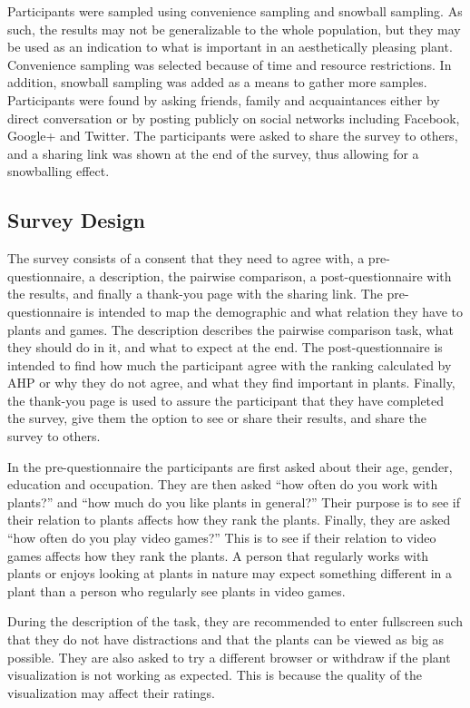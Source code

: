Participants were sampled using convenience sampling and snowball sampling.
As such, the results may not be generalizable to the whole population, but they may be used as an indication to what is important in an aesthetically pleasing plant.
Convenience sampling was selected because of time and resource restrictions.
In addition, snowball sampling was added as a means to gather more samples.
Participants were found by asking friends, family and acquaintances either by direct conversation or by posting publicly on social networks including Facebook, Google+ and Twitter.
The participants were asked to share the survey to others, and a sharing link was shown at the end of the survey, thus allowing for a snowballing effect.


\subsection{Survey Design}
The survey consists of a consent that they need to agree with, a pre-questionnaire, a description, the pairwise comparison, a post-questionnaire with the results, and finally a thank-you page with the sharing link.
The pre-questionnaire is intended to map the demographic and what relation they have to plants and games.
The description describes the pairwise comparison task, what they should do in it, and what to expect at the end.
The post-questionnaire is intended to find how much the participant agree with the ranking calculated by AHP or why they do not agree, and what they find important in plants.
Finally, the thank-you page is used to assure the participant that they have completed the survey, give them the option to see or share their results, and share the survey to others.

In the pre-questionnaire the participants are first asked about their age, gender, education and occupation.
They are then asked ``how often do you work with plants?'' and ``how much do you like plants in general?''
Their purpose is to see if their relation to plants affects how they rank the plants.
Finally, they are asked ``how often do you play video games?''
This is to see if their relation to video games affects how they rank the plants.
A person that regularly works with plants or enjoys looking at plants in nature may expect something different in a plant than a person who regularly see plants in video games.

During the description of the task, they are recommended to enter fullscreen such that they do not have distractions and that the plants can be viewed as big as possible.
They are also asked to try a different browser or withdraw if the plant visualization is not working as expected.
This is because the quality of the visualization may affect their ratings.


